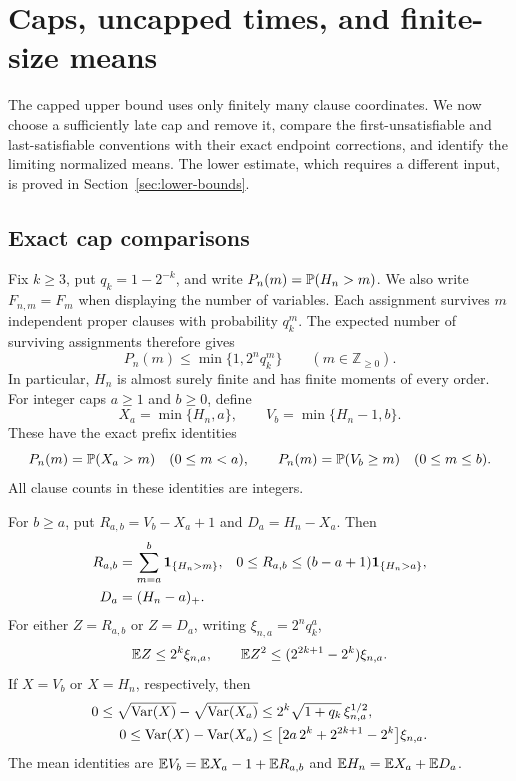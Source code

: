\section{Caps, uncapped times, and finite-size means}
\label{sec:interfaces}

The capped upper bound uses only finitely many clause coordinates.
We now choose a sufficiently late cap and remove it, compare the
first-unsatisfiable and last-satisfiable conventions with their exact
endpoint corrections, and identify the limiting normalized means. The
lower estimate, which requires a different input, is proved in
Section~\ref{sec:lower-bounds}.

\subsection{Exact cap comparisons}

Fix $k\ge3$, put $q_k=1-2^{-k}$, and write $P_n(m)=\mathbb P(H_n>m)$.
We also write $F_{n,m}=F_m$ when displaying the number of variables.
Each assignment survives $m$ independent proper clauses with probability
$q_k^m$. The expected number of surviving assignments therefore gives
\begin{equation}\label{eq:first-moment-tail}
 P_n(m)\le \min\{1,2^nq_k^m\}\qquad(m\in\mathbb Z_{\ge0}).
\end{equation}
In particular, $H_n$ is almost surely finite and has finite moments of
every order. For integer caps $a\ge1$ and $b\ge0$, define
\[
 X_a=\min\{H_n,a\},\qquad V_b=\min\{H_n-1,b\}.
\]
These have the exact prefix identities
\begin{equation}\label{eq:prefix-conventions}
 P_n(m)=\mathbb P(X_a>m)\quad(0\le m<a),\qquad
 P_n(m)=\mathbb P(V_b\ge m)\quad(0\le m\le b).
\end{equation}
All clause counts in these identities are integers.

\begin{proposition}
\label{prop:cap-bridge}
For $b\ge a$, put $R_{a,b}=V_b-X_a+1$ and
$D_a=H_n-X_a$. Then
\begin{align}
 R_{a,b}&=\sum_{m=a}^{b}\mathbf 1_{\{H_n>m\}},
 &0\le R_{a,b}&\le(b-a+1)\mathbf 1_{\{H_n>a\}},\label{eq:finite-cap-identity}\\
 D_a&=(H_n-a)_+.
 \label{eq:uncapped-identity}
\end{align}
For either $Z=R_{a,b}$ or $Z=D_a$, writing $\xi_{n,a}=2^nq_k^a$,
\begin{equation}\label{eq:cap-moments}
 \mathbb E Z\le 2^k\xi_{n,a},\qquad
 \mathbb E Z^2\le (2^{2k+1}-2^k)\xi_{n,a}.
\end{equation}
If $X=V_b$ or $X=H_n$, respectively, then
\begin{align}
 0\le\sqrt{\operatorname{Var}(X)}-\sqrt{\operatorname{Var}(X_a)}
 &\le 2^k\sqrt{1+q_k}\,\xi_{n,a}^{1/2},
 \label{eq:cap-sigma}\\
 0\le\operatorname{Var}(X)-\operatorname{Var}(X_a)
 &\le\bigl[2a\,2^k+2^{2k+1}-2^k\bigr]\xi_{n,a}.
 \label{eq:cap-variance}
\end{align}
The mean identities are $\mathbb E V_b=\mathbb E X_a-1+\mathbb E R_{a,b}$ and
$\mathbb E H_n=\mathbb E X_a+\mathbb E D_a$.
\end{proposition}

